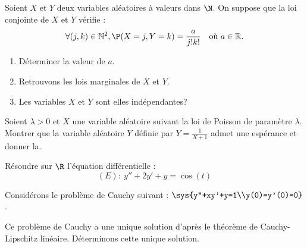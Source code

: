 \documentclass[twoside,a4paper,french,10pt]{VcCours}
\begin{document}
  
\begin{Exercice}
  Soient $X$ et $Y$ deux variables aléatoires à valeurs dans $\N$. On suppose que la loi conjointe de $X$ et $Y$ vérifie :
  \[
  \forall (j,k) \in \mathbb{N}^2,  \P( X = j,Y = k ) = \frac{a}{j!k!}\quad\text{où $a \in \mathbb{R}$.}
  \]
  \begin{enumerate}
  \item
    Déterminer la valeur de $a$.
  \item
    Retrouvons les lois marginales de $X$ et $Y$.
  \item
    Les variables $X$ et $Y$ sont elles indépendantes?
  \end{enumerate}
\end{Exercice}


\begin{Exercice}{} 
  Soient $\lambda >0$ et $X$ une variable aléatoire suivant la loi de Poisson de paramètre $\lambda$. Montrer que la variable aléatoire $Y$ définie par $Y = \frac{1}{X+1}$
  admet une espérance et donner la.
\end{Exercice}
  
\begin{Exercice}
  Résoudre sur $\R$ l'équation différentielle :
  \[(E):\ y''+2y'+y=\cos(t)\]
\end{Exercice}

\begin{Exercice}
  Considérons le problème de Cauchy suivant :
$ \sys{y''+xy'+y=1\\y(0)=y'(0)=0}$.

Ce problème de Cauchy a une unique solution d'après le théorème de Cauchy-Lipschitz linéaire. Déterminons cette unique solution.
\end{Exercice}
\end{document}
